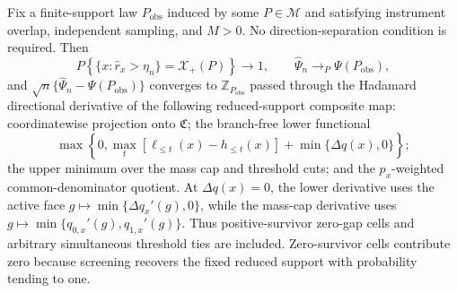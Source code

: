 Fix a finite-support law \(P_{\mathrm{obs}}\) induced by some \(P\in\mathcal M\) and satisfying instrument overlap, independent sampling, and \(M>0\).  No direction-separation condition is required.  Then
\[
P\!\left\{\{x:\widehat r_x>\eta_n\}=\mathcal X_+(P)\right\}\to1,\qquad
\widehat\Psi_n\to_P\Psi(P_{\mathrm{obs}}),
\]
and \(\sqrt n\{\widehat\Psi_n-\Psi(P_{\mathrm{obs}})\}\) converges to \(\mathbb Z_{P_{\mathrm{obs}}}\) passed through the Hadamard directional derivative of the following reduced-support composite map: coordinatewise projection onto \(\mathfrak C\); the branch-free lower functional
\[
\max\left\{0,\max_t[\ell_{\le t}(x)-h_{\le t}(x)]+\min\{\Delta q(x),0\}\right\};
\]
the upper minimum over the mass cap and threshold cuts; and the \(p_x\)-weighted common-denominator quotient.  At \(\Delta q(x)=0\), the lower derivative uses the active face \(g\mapsto\min\{\Delta q_x'(g),0\}\), while the mass-cap derivative uses \(g\mapsto\min\{q_{0,x}'(g),q_{1,x}'(g)\}\).  Thus positive-survivor zero-gap cells and arbitrary simultaneous threshold ties are included.  Zero-survivor cells contribute zero because screening recovers the fixed reduced support with probability tending to one.